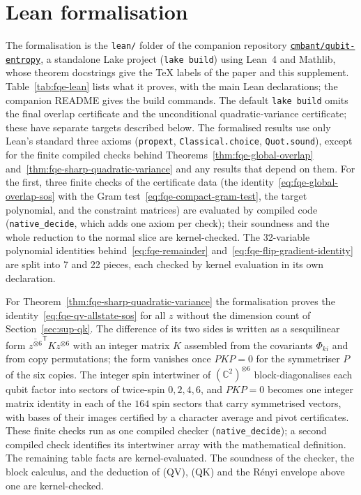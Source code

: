 \section{Lean formalisation}\label{sec:fqe-lean}
The formalisation is the \texttt{lean/} folder of the companion repository \href{https://github.com/cmbant/qubit-entropy}{\texttt{cmbant/qubit-entropy}}, a standalone Lake project
(\texttt{lake build}) using Lean~4 and Mathlib, whose theorem docstrings give the TeX labels of the paper and this
supplement. Table~\ref{tab:fqe-lean} lists what it proves, with the main Lean declarations; the
companion README gives the build commands. The default \texttt{lake build} omits the final overlap certificate and
the unconditional quadratic-variance certificate; these have separate targets described below.
The formalised results use only Lean's standard three axioms
(\texttt{propext}, \texttt{Classical.choice}, \texttt{Quot.sound}), except for the finite compiled checks behind
Theorems~\ref{thm:fqe-global-overlap} and~\ref{thm:fqe-sharp-quadratic-variance} and any results that depend on them.
For the first, three finite
checks of the certificate data (the identity~\eqref{eq:fqe-global-overlap-sos} with the Gram test~\eqref{eq:fqe-compact-gram-test}, the
target polynomial, and the constraint matrices) are evaluated by compiled code (\texttt{native\_decide}, which adds one axiom per
check); their soundness and the whole reduction to the normal slice are kernel-checked. The 32-variable
polynomial identities behind~\eqref{eq:fqe-remainder} and~\eqref{eq:fqe-flip-gradient-identity} are split into 7 and 22
pieces, each checked by kernel evaluation in its own declaration.

For Theorem~\ref{thm:fqe-sharp-quadratic-variance} the formalisation proves the identity~\eqref{eq:fqe-qv-allstate-sos} for
all $z$ without the dimension count of Section~\ref{sec:sup-qk}. The difference of its two sides is written as a
sesquilinear form $\overline{z^{\otimes6}}^{\mathsf T}Kz^{\otimes6}$ with an integer matrix $K$ assembled from the
covariants $\Phi_{ki}$ and from copy permutations; the form vanishes once $PKP=0$ for the symmetriser $P$ of the six copies.
The integer spin intertwiner of $(\mathbb C^2)^{\otimes6}$ block-diagonalises each qubit factor into sectors of twice-spin $0,2,4,6$, and
$PKP=0$ becomes one integer matrix identity in each of the $164$ spin sectors that carry symmetrised vectors, with bases
of their images certified by a character average and pivot certificates. These finite checks run as one compiled checker
(\texttt{native\_decide}); a second compiled check identifies its intertwiner array with the mathematical definition.
The remaining table facts are kernel-evaluated. The soundness of the checker, the block calculus, and the
deduction of (QV), (QK) and the R\'enyi envelope above one are kernel-checked.

